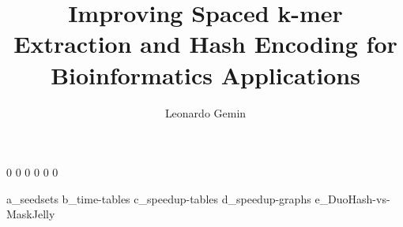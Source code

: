 \documentclass[watermark, figures, tables, algorithms, acronyms, acknowledgments]{DEIThesis}
\title{Improving Spaced k-mer Extraction and Hash Encoding for Bioinformatics Applications}
\author{Leonardo Gemin}
\begin{document}
	\frontmatter
	
	\mainmatter
		{0}
		{0}
		{0}
		{0}
		{0}
		{0}
	
	\appendix
		{a_seedsets}
		{b_time-tables}
		{c_speedup-tables}
		{d_speedup-graphs}
		{e_DuoHash-vs-MaskJelly}
	
	\backmatter
\end{document}
